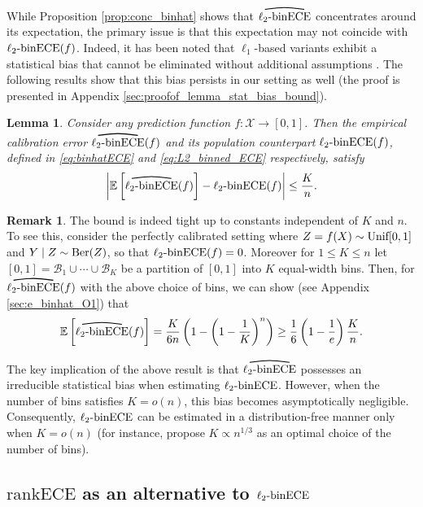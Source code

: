 \documentclass[11pt]{article}
\numberwithin{equation}{section}
\newtheorem{lemma}{Lemma}[section]
\theoremstyle{definition}
\newtheorem{remark}{Remark}[section]
\newcommand{\E}{\mathbb{E}}
\newcommand{\cB}{\mathcal{B}}
\newcommand{\cX}{\mathcal{X}}
\newcommand{\ra}{\rightarrow}
\newcommand{\myoverline}[2][3.5em]{%
  \overset{%
    \tikz[baseline=-0.1ex]{
      \draw[line width=0.75pt]
        (0,0) .. controls (#1/2,0.5ex) .. (#1,0);
    }%
  }{#2}%
}
\newcommand{\binECE}{\mathrm{binECE}}
\newcommand{\lbinECE}{\ell_2\textnormal{-}\binECE}
\newcommand{\binhatECE}{\myoverline{\lbinECE}}
\newcommand{\rankECE}{\mathrm{rankECE}}
\begin{document}
While Proposition \ref{prop:conc_binhat} shows that $\binhatECE$ concentrates around its expectation, the primary issue is that this expectation may not coincide with $\lbinECE(f)$. Indeed, it has been noted that $\ell_1$-based variants exhibit a statistical bias that cannot be eliminated without additional assumptions \citep{futami2024information}. The following results show that this bias persists in our setting as well (the proof is presented in Appendix \ref{sec:proofof_lemma_stat_bias_bound}).

\begin{lemma}\label{lemma:stat_bias_bound}
Consider any prediction function $f:\cX\ra[0,1]$. Then the empirical calibration error $\binhatECE(f)$ and its population counterpart $\lbinECE(f)$, defined in \eqref{eq:binhatECE} and \eqref{eq:L2_binned_ECE} respectively, satisfy
\begin{align*}
    \left|\E\left[\binhatECE(f)\right]-\lbinECE(f)\right|
    \leq
    \frac{K}{n}.
\end{align*}
\end{lemma}


\begin{remark}\label{rmk:stat_bias_bound}
    The bound is indeed tight up to constants independent of $K$ and $n$. To see this, consider the perfectly calibrated setting where $Z = f(X)\sim\textnormal{Unif}[0,1]$ and $Y\mid Z\sim\textnormal{Ber}(Z)$, so that $\lbinECE(f)=0$. Moreover for $1\leq K\leq n$ let $[0,1] = \cB_1\cup\cdots\cup\cB_K$ be a partition of $[0,1]$ into $K$ equal-width bins. Then, for $\binhatECE(f)$ with the above choice of bins, we can show (see Appendix \ref{sec:e_binhat_O1}) that
\begin{align*}
    \E\left[\binhatECE(f)\right]
    =
    \frac{K}{6n}\left(1-\left(1-\frac{1}{K}\right)^n\right)
    \geq
    \frac{1}{6}\left(1-\frac{1}{e}\right)\frac{K}{n}.
\end{align*}
\end{remark}

The key implication of the above result is that $\binhatECE$ possesses an irreducible statistical bias when estimating $\lbinECE$. However, when the number of bins satisfies $K = o(n)$, this bias becomes asymptotically negligible. Consequently, $\lbinECE$ can be estimated in a distribution-free manner only when $K = o(n)$ (for instance, \cite{futami2024information} propose $K\propto n^{1/3}$ as an optimal choice of the number of bins).

\subsection{$\rankECE$ as an alternative to $\lbinECE$}
\end{document}
